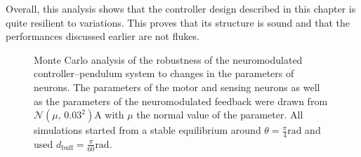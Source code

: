 Overall, this analysis shows that the controller design described in this chapter is quite resilient to variations.
This proves that its structure is sound and that the performances discussed earlier are not flukes.

\begin{figure}[!htbp]
    \centering
    \caption{Monte Carlo analysis of the robustness of the neuromodulated controller–pendulum system to changes in the parameters of neurons. The parameters of the motor and sensing neurons as well as the parameters of the neuromodulated feedback were drawn from $\mathcal{N}\left(\mu,\, 0.03^2\right) \unit{\ampere}$ with $\mu$ the normal value of the parameter. All simulations started from a stable equilibrium around $\theta = \frac{\pi}{4}\unit{\radian}$ and used $d_\text{buff} = \frac{\pi}{60}\unit{\radian}$.}
    \label{fig:neuromod_monte}
\end{figure}

